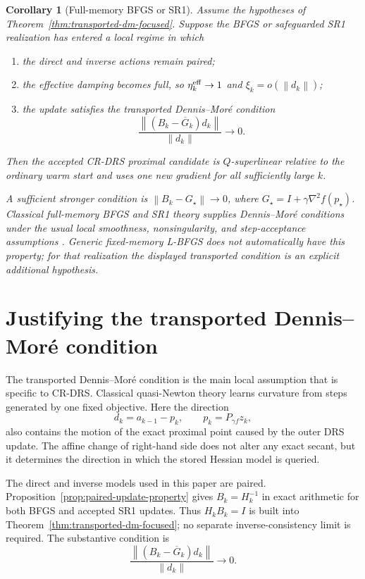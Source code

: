 \documentclass[10pt,leqno]{amsart}
\numberwithin{equation}{section}
\numberwithin{algorithm}{section}
\newtheorem{corollary}[theorem]{Corollary}
\theoremstyle{remark}
\newcommand{\norm}[1]{\left\lVert #1 \right\rVert}
\newcommand{\grad}{\nabla}
\begin{document}
\begin{corollary}[Full-memory BFGS or SR1]
\label{cor:bfgs-sr1-superlinear}
Assume the hypotheses of Theorem~\ref{thm:transported-dm-focused}.  Suppose the BFGS or safeguarded SR1 realization has entered a local regime in which
\begin{enumerate}[label=(\alph*),leftmargin=2.2em]
    \item the direct and inverse actions remain paired;
    \item the effective damping becomes full, so $\eta_k^{\rm eff}\to1$ and $\xi_k=o(\norm{d_k})$;
    \item the update satisfies the transported Dennis--Mor\'e condition
    \[
       \frac{\norm{(B_k-\overline G_k)d_k}}{\norm{d_k}}\to0.
    \]
\end{enumerate}
Then the accepted CR-DRS proximal candidate is $Q$-superlinear relative to the ordinary warm start and uses one new gradient for all sufficiently large $k$.

A sufficient stronger condition is $\norm{B_k-G_\star}\to0$, where
$G_\star=I+\gamma\grad^2f(p_\star)$.  Classical full-memory BFGS and SR1 theory supplies Dennis--Mor\'e conditions under the usual local smoothness, nonsingularity, and step-acceptance assumptions \cite{BroydenDennisMore1973,dennismore1974,DennisMore1977,NocedalWright2006}.  Generic fixed-memory L-BFGS does not automatically have this property; for that realization the displayed transported condition is an explicit additional hypothesis.
\end{corollary}

\section{Justifying the transported Dennis--Mor\'e condition}
\label{sec:dm-coverage}

The transported Dennis--Mor\'e condition is the main local assumption that is specific to CR-DRS.  Classical quasi-Newton theory learns curvature from steps generated by one fixed objective.  Here the direction
\[
    d_k=a_{k-1}-p_k,
    \qquad p_k=P_{\gamma f}z_k,
\]
also contains the motion of the exact proximal point caused by the outer DRS update.  The affine change of right-hand side does not alter any exact secant, but it determines the direction in which the stored Hessian model is queried.

The direct and inverse models used in this paper are paired.  Proposition~\ref{prop:paired-update-property} gives $B_k=H_k^{-1}$ in exact arithmetic for both BFGS and accepted SR1 updates.  Thus $H_kB_k=I$ is built into Theorem~\ref{thm:transported-dm-focused}; no separate inverse-consistency limit is required.  The substantive condition is
\begin{equation}
\label{eq:dm-real-obstacle}
    \frac{\norm{(B_k-\overline G_k)d_k}}{\norm{d_k}}\longrightarrow0.
\end{equation}
\end{document}
